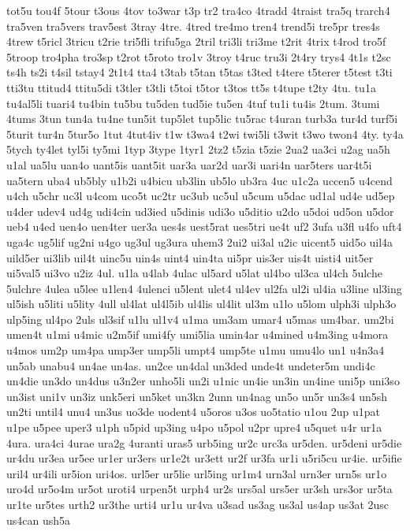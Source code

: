 {tot5u
tou4f
5tour
t3ous
4tov
to3war
t3p
tr2
tra4co
4tradd
4traist
tra5q
trarch4
tra5ven
tra5vers
trav5est
3tray
4tre.
4tred
tre4mo
tren4
trend5i
tre5pr
tres4s
4trew
t5ricl
3tricu
t2rie
tri5fli
trifu5ga
2tril
tri3li
tri3me
t2rit
4trix
t4rod
tro5f
5troop
tro4pha
tro3sp
t2rot
t5roto
tro1v
3troy
t4ruc
tru3i
2t4ry
trys4
4t1s
t2sc
ts4h
ts2i
t4sil
tstay4
2t1t4
tta4
t3tab
t5tan
t5tas
t3ted
t4tere
t5terer
t5test
t3ti
tti3tu
ttitud4
ttitu5di
t3tler
t3tli
t5toi
t5tor
t3tos
tt5s
t4tupe
t2ty
4tu.
tu1a
tu4al5li
tuari4
tu4bin
tu5bu
tu5den
tud5ie
tu5en
4tuf
tu1i
tu4is
2tum.
3tumi
4tums
3tun
tun4a
tu4ne
tun5it
tup5let
tup5lic
tu5rac
t4uran
turb3a
tur4d
turf5i
5turit
tur4n
5tur5o
1tut
4tut4iv
t1w
t3wa4
t2wi
twi5li
t3wit
t3wo
twon4
4ty.
ty4a
5tych
ty4let
tyl5i
ty5mi
1typ
3type
1tyr1
2tz2
t5zia
t5zie
2ua2
ua3ci
u2ag
ua5h
u1al
ua5lu
uan4o
uant5is
uant5it
uar3a
uar2d
uar3i
uari4n
uar5ters
uar4t5i
ua5tern
uba4
ub5bly
u1b2i
u4bicu
ub3lin
ub5lo
ub3ra
4uc
u1c2a
uccen5
u4cend
u4ch
u5chr
uc3l
u4com
uco5t
uc2tr
uc3ub
uc5ul
u5cum
u5dac
ud1al
ud4e
ud5ep
u4der
udev4
ud4g
udi4cin
ud3ied
u5dinis
udi3o
u5ditio
u2do
u5doi
ud5on
u5dor
ueb4
u4ed
uen4o
uen4ter
uer3a
ues4s
uest5rat
ues5tri
ue4t
uf2
3ufa
u3fl
u4fo
uft4
uga4c
ug5lif
ug2ni
u4go
ug3ul
ug3ura
uhem3
2ui2
ui3al
u2ic
uicent5
uid5o
uil4a
uild5er
ui3lib
uil4t
uinc5u
uin4s
uint4
uin4ta
ui5pr
uis3er
uis4t
uisti4
uit5er
ui5val5
ui3vo
u2iz
4ul.
u1la
u4lab
4ulac
ul5ard
u5lat
ul4bo
ul3ca
ul4ch
5ulche
5ulchre
4ulea
u5lee
u1len4
4ulenci
u5lent
ulet4
ul4ev
ul2fa
ul2i
ul4ia
u3line
ul3ing
ul5ish
u5liti
u5lity
4ull
ul4lat
ul4l5ib
ul4lis
ul4lit
ul3m
u1lo
u5lom
ulph3i
ulph3o
ulp5ing
ul4po
2uls
ul3sif
u1lu
ul1v4
u1ma
um3am
umar4
u5mas
um4bar.
um2bi
umen4t
u1mi
u4mic
u2m5if
umi4fy
umi5lia
umin4ar
u4mined
u4m3ing
u4mora
u4mos
um2p
um4pa
ump3er
ump5li
umpt4
ump5te
u1mu
umu4lo
un1
u4n3a4
un5ab
unabu4
un4ae
un4as.
un2ce
un4dal
un3ded
unde4t
undeter5m
undi4c
un4die
un3do
un4dus
u3n2er
unho5li
un2i
u1nic
un4ie
un3in
un4ine
uni5p
uni3so
un3ist
uni1v
un3iz
unk5eri
un5ket
un3kn
2unn
un4nag
un5o
un5r
un3s4
un5sh
un2ti
until4
unu4
un3us
uo3de
uodent4
u5oros
u3os
uo5tatio
u1ou
2up
u1pat
u1pe
u5pee
uper3
u1ph
u5pid
up3ing
u4po
u5pol
u2pr
upre4
u5quet
u4r
ur1a
4ura.
ura4ci
4urae
ura2g
4uranti
uras5
urb5ing
ur2c
urc3a
ur5den.
ur5deni
ur5die
ur4du
ur3ea
ur5ee
ur1er
ur3ers
ur1e2t
ur3ett
ur2f
ur3fa
ur1i
u5ri5cu
ur4ie.
ur5ifie
uril4
ur4ili
ur5ion
uri4os.
url5er
ur5lie
url5ing
ur1m4
urn3al
urn3er
urn5s
ur1o
uro4d
ur5o4m
ur5ot
uroti4
urpen5t
urph4
ur2s
urs5al
urs5er
ur3sh
urs3or
ur5ta
ur1te
ur5tes
urth2
ur3the
urti4
ur1u
ur4va
u3sad
us3ag
us3al
us4ap
us3at
2usc
us4can
ush5a
}
